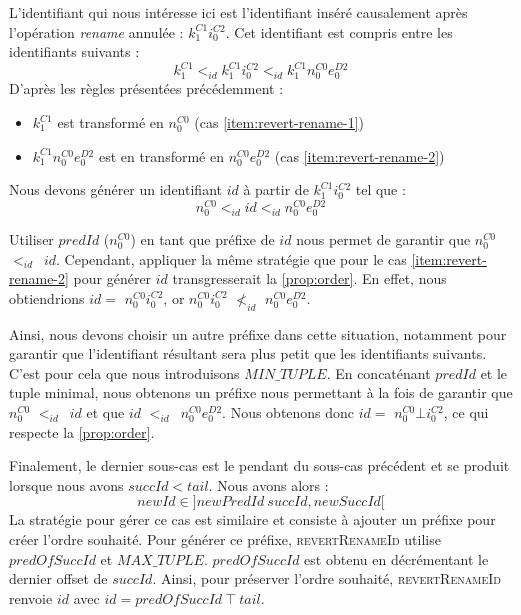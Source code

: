 \documentclass[12pt]{thesul}
\newcommand{\trm}[1]{\mathit{#1}}
\newcommand{\id}[3]{$\trm{#1}^{\trm{#2}}_{\trm{#3}}$}
\newcommand{\lid}{$<_{id}$~}
\begin{document}
L'identifiant qui nous intéresse ici est l'identifiant inséré causalement après l'opération \emph{rename} annulée : \id{k}{C1}{1}\id{i}{C2}{0}.
Cet identifiant est compris entre les identifiants suivants :
\[k^{C1}_{1} <_{id} k^{C1}_{1}i^{C2}_{0} <_{id} k^{C1}_{1}n^{C0}_{0}e^{D2}_{0}\]
D'après les règles présentées précédemment :
\begin{itemize}
  \item \id{k}{C1}{1} est transformé en \id{n}{C0}{0} (cas \ref{item:revert-rename-1})
  \item \id{k}{C1}{1}\id{n}{C0}{0}\id{e}{D2}{0} est en transformé en \id{n}{C0}{0}\id{e}{D2}{0} (cas \ref{item:revert-rename-2})
\end{itemize}
Nous devons générer un identifiant $\trm{id}$ à partir de \id{k}{C1}{1}\id{i}{C2}{0} tel que :
\[n^{C0}_{0} <_{id} \trm{id} <_{id} n^{C0}_{0}e^{D2}_{0}\]

Utiliser $\trm{predId}$ (\id{n}{C0}{0}) en tant que préfixe de $\trm{id}$ nous permet de garantir que \id{n}{C0}{0} \lid $\trm{id}$.
Cependant, appliquer la même stratégie que pour le cas \ref{item:revert-rename-2} pour générer $\trm{id}$ transgresserait la \autoref{prop:order}.
En effet, nous obtiendrions $\trm{id} = $ \id{n}{C0}{0}\id{i}{C2}{0}, or \id{n}{C0}{0}\id{i}{C2}{0} $\nless_{id}$ \id{n}{C0}{0}\id{e}{D2}{0}.

Ainsi, nous devons choisir un autre préfixe dans cette situation, notamment pour garantir que l'identifiant résultant sera plus petit que les identifiants suivants.
C'est pour cela que nous introduisons $MIN\_TUPLE$.
En concaténant $\trm{predId}$ et le tuple minimal, nous obtenons un préfixe nous permettant à la fois de garantir que \id{n}{C0}{0} \lid $\trm{id}$ et que $\trm{id}$ \lid \id{n}{C0}{0}\id{e}{D2}{0}.
Nous obtenons donc $\trm{id} = $ \id{n}{C0}{0}$\bot$\id{i}{C2}{0}, ce qui respecte la \autoref{prop:order}.

Finalement, le dernier sous-cas est le pendant du sous-cas précédent et se produit lorsque nous avons $\trm{succId} < \trm{tail}$.
Nous avons alors :
\[\trm{newId} \in ]\trm{newPredId~succId}, \trm{newSuccId}[\]
La stratégie pour gérer ce cas est similaire et consiste à ajouter un préfixe pour créer l'ordre souhaité.
Pour générer ce préfixe, \textsc{revertRenameId} utilise  $\trm{predOfSuccId}$ et $MAX\_TUPLE$.
$\trm{predOfSuccId}$ est obtenu en décrémentant le dernier offset de $\trm{succId}$.
Ainsi, pour préserver l'ordre souhaité, \textsc{revertRenameId} renvoie $\trm{id}$ avec $\trm{id} = \trm{predOfSuccId~\top~tail}$.
\end{document}
